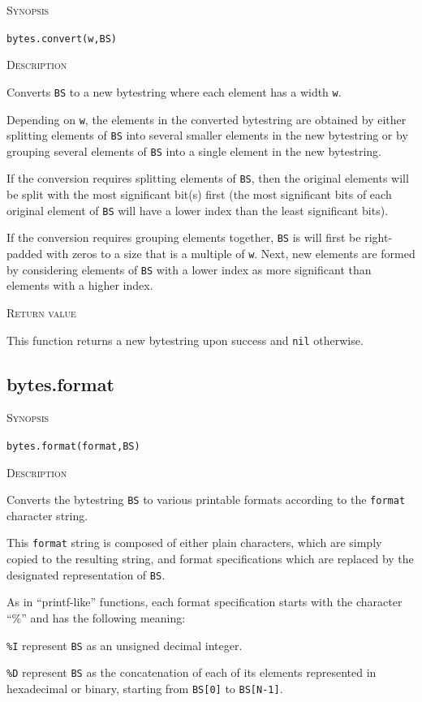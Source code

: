 \documentclass[11pt]{report}
\newcommand{\mansection}[1]{\vspace{0.5em}\par\noindent\textsc{#1}\vspace{0.5em}\par}
\newcommand{\syn}[1]{\texttt{#1}}
\begin{document}
\mansection{Synopsis}
\syn{bytes.convert(w,BS)}

\mansection{Description}
  Converts \syn{BS} to a new bytestring where each element has a width \syn{w}.

  Depending on \syn{w}, the elements in the converted bytestring are obtained by either 
  splitting elements of \syn{BS} into several smaller elements in the new bytestring or 
  by grouping several elements of \syn{BS} into a single element in the new bytestring.

  If the conversion requires splitting elements of \syn{BS}, then the original elements will
  be split with the most significant bit(s) first (the most significant bits of each 
  original element of \syn{BS} will have a lower index than the least significant bits). 

  If the conversion requires grouping elements together, \syn{BS} is will first be 
  right-padded with zeros to a size that is a multiple of \syn{w}. Next, new 
  elements are formed by considering elements of \syn{BS} with a lower index as more 
  significant than elements with a higher index.

\mansection{Return value}
  This function returns a new bytestring upon success and \syn{nil} otherwise.

\subsection{bytes.format}

\mansection{Synopsis}
\syn{bytes.format(format,BS)}

\mansection{Description}
  Converts the bytestring \syn{BS} to various printable formats according to the \syn{format} character string.

  This \syn{format} string is composed of either plain characters, which are simply copied to the resulting string, and
  format specifications which are replaced by the designated representation of \syn{BS}.

  As in ``printf-like'' functions, each format specification starts with the character ``\%'' and has the following meaning:

  \syn{\%I} represent \syn{BS} as an unsigned decimal integer.
  
  \syn{\%D} represent \syn{BS} as the concatenation of each of its elements represented in 
  hexadecimal or binary, starting from \syn{BS[0]} to \syn{BS[N-1]}.
  
\end{document}
